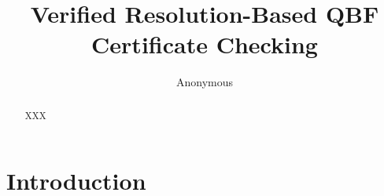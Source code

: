 \documentclass[runningheads]{llncs}
\newcommand{\0}{0}
\newcommand{\1}{1}
\begin{document}

%
\title{Verified Resolution-Based QBF Certificate Checking}


%
\author{Anonymous}

%
%
\maketitle              %
%
\begin{abstract} 
 XXX

\end{abstract}

\section{Introduction}
\label{sec:intro}
\end{document}
